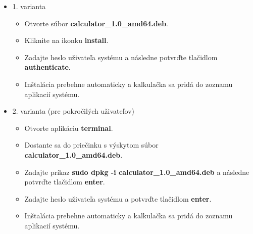 \documentclass[11pt, a4paper]{article}
\begin{document}
    \begin{itemize}
        \item 1. varianta
        \begin{itemize}
            \item Otvorte súbor \textbf{calculator\_1.0\_amd64.deb}.
            \item Kliknite na ikonku \textbf{install}.
            \item Zadajte heslo uživateľa systému a následne potvrďte tlačidlom \textbf{authenticate}.
            \item Inštalácia prebehne automaticky a kalkulačka sa pridá do zoznamu aplikacií systému.
        \end{itemize}
        \item 2. varianta (pre pokročilých uživateľov)
        \begin{itemize}
            \item Otvorte aplikáciu \textbf{terminal}.
            \item Dostante sa do priečinku s výskytom súbor \textbf{calculator\_1.0\_amd64.deb}.
            \item Zadajte príkaz \textbf{sudo dpkg -i calculator\_1.0\_amd64.deb} a následne potvrďte tlačidlom \textbf{enter}.
            \item Zadajte heslo uživateľa systému a potvrďte tlačidlom \textbf{enter}.
            \item Inštalácia prebehne automaticky a kalkulačka sa pridá do zoznamu aplikacií systému.
        \end{itemize}
    \end{itemize}
     
\end{document}
